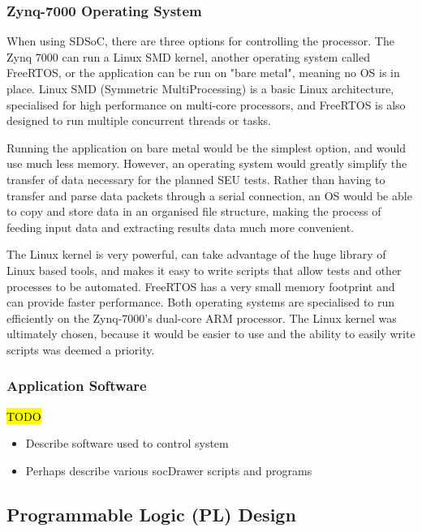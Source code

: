 \documentclass[12pt]{article}
\begin{document}
\subsubsection{Zynq-7000 Operating System}
\label{sec:Design-PS-OS}

When using SDSoC, there are three options for controlling the processor. The Zynq 7000 can run a Linux SMD kernel, another operating system called FreeRTOS, or the application can be run on "bare metal", meaning no OS is in place. Linux SMD (Symmetric MultiProcessing) is a basic Linux architecture, specialised for high performance on multi-core processors, and FreeRTOS is also designed to run multiple concurrent threads or tasks.

Running the application on bare metal would be the simplest option, and would use much less memory. However, an operating system would greatly simplify the transfer of data necessary for the planned SEU tests. Rather than having to transfer and parse data packets through a serial connection, an OS would be able to copy and store data in an organised file structure, making the process of feeding input data and extracting results data much more convenient.

The Linux kernel is very powerful, can take advantage of the huge library of Linux based tools, and makes it easy to write scripts that allow tests and other processes to be automated. FreeRTOS has a very small memory footprint and can provide faster performance. Both operating systems are specialised to run efficiently on the Zynq-7000's dual-core ARM processor. The Linux kernel was ultimately chosen, because it would be easier to use and the ability to easily write scripts was deemed a priority.

\subsubsection{Application Software}
\label{sec:Design-PS-SW}

\hl{TODO}

\begin{itemize}
\item Describe software used to control system
\item Perhaps describe various socDrawer scripts and programs
\end{itemize}

\subsection{Programmable Logic (PL) Design}
\label{sec:Design-PL}
\end{document}
